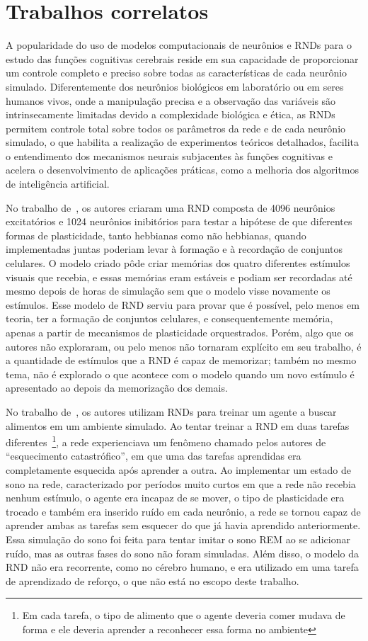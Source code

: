 \section{Trabalhos correlatos}

A popularidade do uso de modelos computacionais de neurônios e RNDs para o estudo das funções cognitivas cerebrais reside em sua
capacidade de proporcionar um controle completo e preciso sobre todas as características de cada neurônio simulado. Diferentemente
dos neurônios biológicos em laboratório ou em seres humanos vivos, onde a manipulação precisa e a observação das variáveis são
intrinsecamente limitadas devido a complexidade biológica e ética, as RNDs permitem controle total sobre todos os parâmetros da
rede e de cada neurônio simulado, o que habilita a realização de experimentos teóricos detalhados, facilita o entendimento dos
mecanismos neurais subjacentes às funções cognitivas e acelera o desenvolvimento de aplicações práticas, como a melhoria dos
algoritmos de inteligência artificial. 

No trabalho de~\cite{zenkeDiverse2015}, os autores criaram uma RND composta de 4096 neurônios excitatórios e 1024 neurônios inibitórios para
testar a hipótese de que diferentes formas de plasticidade, tanto hebbianas como não hebbianas, quando implementadas juntas
poderiam levar à formação e à recordação de conjuntos celulares. O modelo criado pôde criar memórias dos quatro diferentes
estímulos visuais que recebia, e essas memórias eram estáveis e podiam ser recordadas até mesmo depois de horas de simulação sem
que o modelo visse novamente os estímulos. Esse modelo de RND serviu para provar que é possível, pelo menos em teoria, ter a
formação de conjuntos celulares, e consequentemente memória, apenas a partir de mecanismos de plasticidade orquestrados. Porém,
algo que os autores não exploraram, ou pelo menos não tornaram explícito em seu trabalho, é a quantidade de estímulos que a RND é
capaz de memorizar; também no mesmo tema, não é explorado o que acontece com o modelo quando um novo estímulo é apresentado ao
depois da memorização dos demais.

No trabalho de~\cite{goldenSleep2022}, os autores utilizam RNDs para treinar um agente a buscar alimentos em um ambiente simulado.
Ao tentar treinar a RND em duas tarefas diferentes~\footnote{Em cada tarefa, o tipo de alimento que o agente deveria comer mudava
de forma e ele deveria aprender a reconhecer essa forma no ambiente}, a rede experienciava um fenômeno chamado pelos autores de
``esquecimento catastrófico'', em que uma das tarefas aprendidas era completamente esquecida após aprender a outra. Ao implementar
um estado de sono na rede, caracterizado por períodos muito curtos em que a rede não recebia nenhum estímulo, o agente era incapaz
de se mover, o tipo de plasticidade era trocado e também era inserido ruído em cada neurônio, a rede se tornou capaz de aprender
ambas as tarefas sem esquecer do que já havia aprendido anteriormente. Essa simulação do sono foi feita para tentar imitar o sono
REM ao se adicionar ruído, mas as outras fases do sono não foram simuladas. Além disso, o modelo da RND não era recorrente, como
no cérebro humano, e era utilizado em uma tarefa de aprendizado de reforço, o que não está no escopo deste trabalho.

